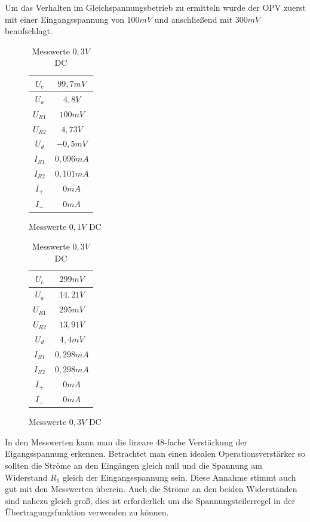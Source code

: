 Um das Verhalten im Gleichspannungsbetrieb zu ermitteln wurde der OPV zuerst mit einer Eingangsspannung von $100mV$ und anschließend
mit $300mV$ beaufschlagt.\\

\begin{table}[H]
\begin{minipage}{.5\textwidth}
\begin{figure}[H]
\centering
 \begin{tabular}{c|c}
  $U_e$ & $99,7mV$ \\ \hline
  $U_a$ & $4,8V$ \\ \hline
  $U_{R1}$ & $100mV$ \\ \hline
  $U_{R2}$ & $4,73V$ \\ \hline
  $U_d$ & $-0,5mV$ \\ \hline
  $I_{R1}$ & $0,096mA$ \\ \hline
  $I_{R2}$ & $0,101mA$ \\ \hline
  $I_+$ & $0mA$ \\ \hline
  $I_-$ & $0mA$ \\
 \end{tabular}
  \caption{Messwerte $0,1V$ DC}
\end{figure}
\end{minipage}
\begin{minipage}{.5\textwidth}
\begin{figure}[H]
  \centering
 \begin{tabular}{c|c}
  $U_e$ & $299mV$ \\ \hline
  $U_a$ & $14,21V$ \\ \hline
  $U_{R1}$ & $295mV$ \\ \hline
  $U_{R2}$ & $13,91V$ \\ \hline
  $U_d$ & $4,4mV$ \\ \hline
  $I_{R1}$ & $0,298mA$ \\ \hline
  $I_{R2}$ & $0,298mA$ \\ \hline
  $I_+$ & $0mA$ \\ \hline
  $I_-$ & $0mA$ \\
 \end{tabular}
 \caption{Messwerte $0,3V$ DC}
\end{figure}
\end{minipage}
\end{table}
\noindent
In den Messwerten kann man die lineare 48-fache Verstärkung der Eigangsspannung erkennen. Betrachtet man einen
idealen Operationsverstärker so sollten die Ströme an den Eingängen gleich null und die Spannung am Widerstand $R_1$
gleich der Eingangsspannung sein. Diese Annahme stimmt auch gut mit den Messwerten überein. Auch die Ströme an den
beiden Widerständen sind nahezu gleich groß, dies ist erforderlich um die Spannungsteilerregel in der Übertragungsfunktion
verwenden zu können.\\

